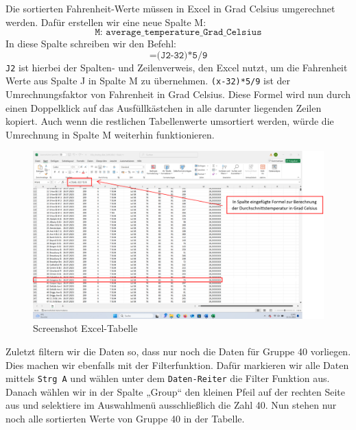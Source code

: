 \documentclass[a4paper, 12pt]{article}
\begin{document}
Die sortierten Fahrenheit-Werte müssen in Excel in Grad Celsius umgerechnet werden. Dafür erstellen wir eine neue Spalte M: \[\texttt{M: average\_temperature\_Grad\_Celsius}\] In diese Spalte schreiben wir den Befehl: \[\texttt{=(J2-32)*5/9}\] \newline \texttt{J2} ist hierbei der Spalten- und Zeilenverweis, den Excel nutzt, um die Fahrenheit Werte aus Spalte J in Spalte M zu übernehmen. \newline \texttt{(x-32)*5/9} ist der Umrechnungsfaktor von Fahrenheit in Grad Celsius. Diese Formel wird nun durch einen Doppelklick auf das Ausfüllkästchen in alle darunter liegenden Zeilen kopiert. Auch wenn die restlichen Tabellenwerte umsortiert werden, würde die Umrechnung in Spalte M weiterhin funktionieren.

\newpage
\begin{figure}[!htb]
\centering
\includegraphics[scale=.4]{Screenshot 2024-11-26 201341}
\caption{Screenshot Excel-Tabelle}
\label{fig:Screenshot Excel-Tabelle}
\end{figure}

Zuletzt filtern wir die Daten so, dass nur noch die Daten für Gruppe 40 vorliegen. Dies machen wir ebenfalls mit der Filterfunktion. Dafür markieren wir alle Daten mittels \texttt{Strg A} und wählen unter dem \texttt{Daten-Reiter} die Filter Funktion aus. Danach wählen wir in der Spalte „Group“ den kleinen Pfeil auf der rechten Seite aus und selektiere im Auswahlmenü ausschließlich die Zahl 40. Nun stehen nur noch alle sortierten Werte von Gruppe 40 in der Tabelle.
\end{document}
